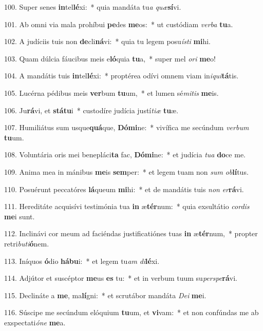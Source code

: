 100. Super senes \textbf{in}tel\textbf{lé}xi:~*  quia mandáta tu\textit{a} \textit{quæ}\textbf{sí}vi.\

101. Ab omni via mala prohíbui \textbf{pe}des \textbf{me}os:~*  ut custódiam \textit{ver}\textit{ba} \textbf{tu}a.\

102. A judíciis tuis non \textbf{de}cli\textbf{ná}vi:~*  quia tu legem posu\textit{ís}\textit{ti} \textbf{mi}hi.\

103. Quam dúlcia fáucibus meis e\textbf{ló}quia \textbf{tu}a,~*  super mel \textit{o}\textit{ri} \textbf{me}o!\

104. A mandátis tuis \textbf{in}tel\textbf{lé}xi:~*  proptérea odívi omnem viam in\textit{i}\textit{qui}\textbf{tá}tis.\

105. Lucérna pédibus meis \textbf{ver}bum \textbf{tu}um,~*  et lumen sé\textit{mi}\textit{tis} \textbf{me}is.\

106. Ju\textbf{rá}vi, et \textbf{stá}\textbf{tu}i~*  custodíre judícia justí\textit{ti}\textit{æ} \textbf{tu}æ.\

107. Humiliátus sum usque\textbf{quá}que, \textbf{Dó}\textbf{mi}ne:~*  vivífica me secúndum \textit{ver}\textit{bum} \textbf{tu}um.\

108. Voluntária oris mei benepláci\textbf{ta} fac, \textbf{Dó}\textbf{mi}ne:~*  et judícia \textit{tu}\textit{a} \textbf{do}ce me.\

109. Anima mea in mánibus \textbf{me}is \textbf{sem}per:~*  et legem tuam non \textit{sum} \textit{ob}\textbf{lí}tus.\

110. Posuérunt peccatóres \textbf{lá}queum \textbf{mi}hi:~*  et de mandátis tuis \textit{non} \textit{er}\textbf{rá}vi.\

111. Hereditáte acquisívi testimónia tua \textbf{in} æ\textbf{tér}num:~*  quia exsultátio \textit{cor}\textit{dis} \textbf{me}i sunt.\

112. Inclinávi cor meum ad faciéndas justificatiónes tuas \textbf{in} æ\textbf{tér}num,~*  propter retri\textit{bu}\textit{ti}\textbf{ó}nem.\

113. Iníquos \textbf{ó}dio \textbf{há}\textbf{bu}i:~*  et legem tu\textit{am} \textit{di}\textbf{lé}xi.\

114. Adjútor et suscéptor \textbf{me}us \textbf{es} tu:~*  et in verbum tuum su\textit{per}\textit{spe}\textbf{rá}vi.\

115. Declináte a \textbf{me}, ma\textbf{lí}gni:~*  et scrutábor mandáta \textit{De}\textit{i} \textbf{me}i.\

116. Súscipe me secúndum elóquium \textbf{tu}um, et \textbf{vi}vam:~*  et non confúndas me ab exspectati\textit{ó}\textit{ne} \textbf{me}a.\

